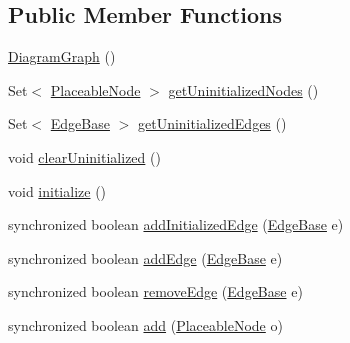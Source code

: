 \subsection*{Public Member Functions}
\begin{DoxyCompactItemize}
\item 
\hyperlink{classorg_1_1tzi_1_1use_1_1gui_1_1views_1_1diagrams_1_1_diagram_graph_adef179b2ba82362437cd9e9bb5663fb1}{Diagram\-Graph} ()
\item 
Set$<$ \hyperlink{classorg_1_1tzi_1_1use_1_1gui_1_1views_1_1diagrams_1_1elements_1_1_placeable_node}{Placeable\-Node} $>$ \hyperlink{classorg_1_1tzi_1_1use_1_1gui_1_1views_1_1diagrams_1_1_diagram_graph_aeb5c30b5b4eb8c55597292a11ae54df9}{get\-Uninitialized\-Nodes} ()
\item 
Set$<$ \hyperlink{classorg_1_1tzi_1_1use_1_1gui_1_1views_1_1diagrams_1_1elements_1_1edges_1_1_edge_base}{Edge\-Base} $>$ \hyperlink{classorg_1_1tzi_1_1use_1_1gui_1_1views_1_1diagrams_1_1_diagram_graph_a7c34de96faf82a11cfcb77d2cfd261d7}{get\-Uninitialized\-Edges} ()
\item 
void \hyperlink{classorg_1_1tzi_1_1use_1_1gui_1_1views_1_1diagrams_1_1_diagram_graph_a8d7e7d4676b6ce20f6697209035f81b0}{clear\-Uninitialized} ()
\item 
void \hyperlink{classorg_1_1tzi_1_1use_1_1gui_1_1views_1_1diagrams_1_1_diagram_graph_aab8be650170ff5848d34c4bd5d0653be}{initialize} ()
\item 
synchronized boolean \hyperlink{classorg_1_1tzi_1_1use_1_1gui_1_1views_1_1diagrams_1_1_diagram_graph_a01e61e0ab1db084ffe0c5db06d702dae}{add\-Initialized\-Edge} (\hyperlink{classorg_1_1tzi_1_1use_1_1gui_1_1views_1_1diagrams_1_1elements_1_1edges_1_1_edge_base}{Edge\-Base} e)
\item 
synchronized boolean \hyperlink{classorg_1_1tzi_1_1use_1_1gui_1_1views_1_1diagrams_1_1_diagram_graph_adddf75b4785afc434a16ebfe7b33aa51}{add\-Edge} (\hyperlink{classorg_1_1tzi_1_1use_1_1gui_1_1views_1_1diagrams_1_1elements_1_1edges_1_1_edge_base}{Edge\-Base} e)
\item 
synchronized boolean \hyperlink{classorg_1_1tzi_1_1use_1_1gui_1_1views_1_1diagrams_1_1_diagram_graph_a2ddcb20597f855b2b20d55c42874f4c9}{remove\-Edge} (\hyperlink{classorg_1_1tzi_1_1use_1_1gui_1_1views_1_1diagrams_1_1elements_1_1edges_1_1_edge_base}{Edge\-Base} e)
\item 
synchronized boolean \hyperlink{classorg_1_1tzi_1_1use_1_1gui_1_1views_1_1diagrams_1_1_diagram_graph_a7d8e8fd08f720b892b0eed22083c3815}{add} (\hyperlink{classorg_1_1tzi_1_1use_1_1gui_1_1views_1_1diagrams_1_1elements_1_1_placeable_node}{Placeable\-Node} o)

\end{DoxyCompactItemize}
